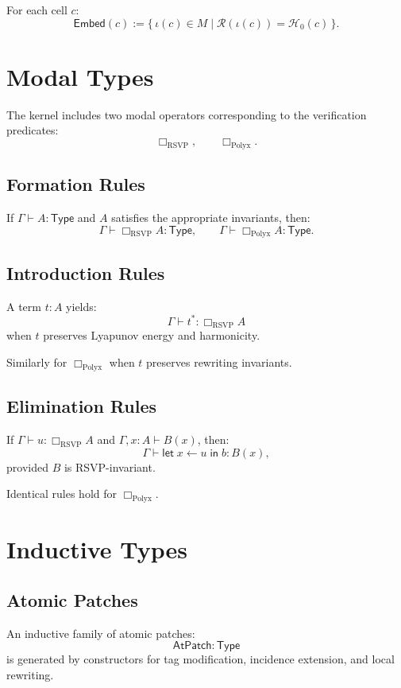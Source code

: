 For each cell $c$:
\[
\mathsf{Embed}(c) := \{\, \iota(c) \in M \mid \mathcal{R}(\iota(c)) = \mathcal{H}_0(c) \,\}.
\]

\section{Modal Types}

The kernel includes two modal operators corresponding to the verification predicates:
\[
\Box_{\mathrm{RSVP}}, \qquad 
\Box_{\mathrm{Polyx}}.
\]

\subsection{Formation Rules}

If $\Gamma \vdash A : \mathsf{Type}$ and $A$ satisfies the appropriate invariants, then:
\[
\Gamma \vdash \Box_{\mathrm{RSVP}} A : \mathsf{Type}, \qquad
\Gamma \vdash \Box_{\mathrm{Polyx}} A : \mathsf{Type}.
\]

\subsection{Introduction Rules}

A term $t : A$ yields:
\[
\Gamma \vdash t^{\ast} : \Box_{\mathrm{RSVP}} A
\]
when $t$ preserves Lyapunov energy and harmonicity.

Similarly for $\Box_{\mathrm{Polyx}}$ when $t$ preserves rewriting invariants.

\subsection{Elimination Rules}

If $\Gamma \vdash u : \Box_{\mathrm{RSVP}} A$ and $\Gamma, x : A \vdash B(x)$, then:
\[
\Gamma \vdash \mathsf{let}\; x \leftarrow u \; \mathsf{in}\; b : B(x),
\]
provided $B$ is RSVP-invariant.

Identical rules hold for $\Box_{\mathrm{Polyx}}$.

\section{Inductive Types}

\subsection{Atomic Patches}

An inductive family of atomic patches:
\[
\mathsf{AtPatch} : \mathsf{Type}
\]
is generated by constructors for tag modification, incidence extension, and local rewriting.

